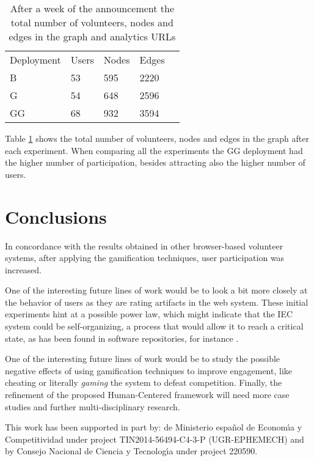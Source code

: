 \begin{table}
  \small
  \caption{After a week of the announcement the total number of volunteers, 
  nodes and edges in the graph and analytics URLs}
  \label{tab:urls} 
  \centering
  \small
  \begin{tabular}{l l l l l}
    \hline\noalign{\smallskip}
     Deployment &  Users &  Nodes &  Edges \\
    \noalign{\smallskip}\hline\noalign{\smallskip}
    B   & 53 &  595   & 2220   \\ \hline
    G   & 54 &  648   & 2596   \\ \hline
    GG  & 68 &  932   & 3594   \\ \hline
    \end{tabular}
\end{table}

Table \ref{tab:urls} shows the total number of volunteers, nodes and edges 
in the graph after each experiment. 
When comparing all the experiments the GG deployment had the higher
number of participation, besides attracting also the higher number of users.    

  
\section{Conclusions}
\label{sec:conclusions}

In concordance with the results obtained in other 
browser-based volunteer systems, after 
applying the gamification techniques, user participation was increased. 

One of the interesting future lines of work would be to look a bit
more closely at the behavior of users as they are rating artifacts 
in the web system. These initial experiments hint at a possible power law, which might indicate that
the IEC system could be self-organizing, a process that would allow it
to reach a critical state, as has been found in software repositories,
for instance \cite{Merelo2016:repomining}. 

One of the interesting future lines of work would be to study the possible negative effects of using  
gamification techniques to improve engagement, like cheating or
literally {\em gaming} the system to defeat competition. 
Finally, the refinement of the proposed Human-Centered framework will need
more case studies and further multi-disciplinary research. 

\begin{acks}
This work has been supported in part by: de Ministerio espa\~{n}ol de Econom\'{\i}a y Competitividad under project TIN2014-56494-C4-3-P (UGR-EPHEMECH) and by Consejo Nacional de Ciencia y Tecnolog\'{\i}a under project 220590.




\end{acks}
